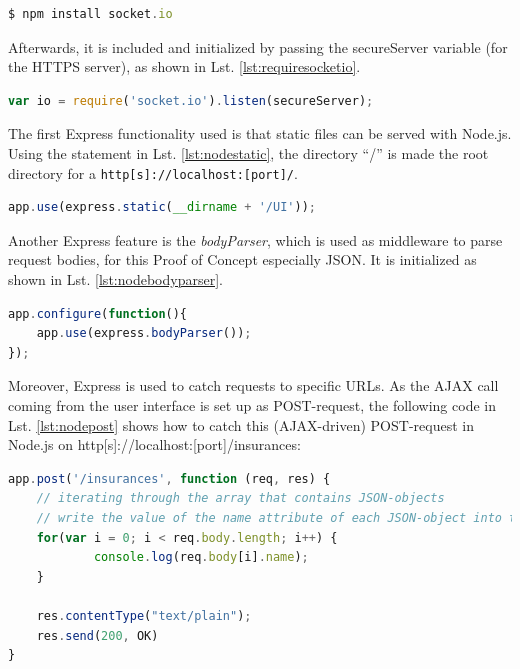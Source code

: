 \begin{lstlisting}[language=javascript,
caption={Command to install socket.io via Node.js' package manager},
label=lst:installsocketio,
morekeywords={npm}]
$ npm install socket.io
\end{lstlisting}%

Afterwards, it is included and initialized by passing the secureServer variable
(for the HTTPS server), as shown in Lst. \ref{lst:requiresocketio}.

\begin{lstlisting}[language=javascript,caption={Initialization of the socket.io module in Node.js},label=lst:requiresocketio]
var io = require('socket.io').listen(secureServer);
\end{lstlisting}

The first Express functionality used is that static files can be served with
Node.js. Using the statement in Lst. \ref{lst:nodestatic}, the directory “/” is made the root
directory for a \texttt{http[s]://localhost:[port]/}.

\begin{lstlisting}[language=javascript,caption={Serving static assets with Express},label=lst:nodestatic]
app.use(express.static(__dirname + '/UI'));
\end{lstlisting}

Another Express feature is the \textit{bodyParser}, which is used as middleware to
parse request bodies, for this Proof of Concept especially JSON. It is initialized as shown in Lst. \ref{lst:nodebodyparser}.

\begin{lstlisting}[language=javascript,caption={Using the bodyParser},label=lst:nodebodyparser]
app.configure(function(){
    app.use(express.bodyParser());
});
\end{lstlisting}

Moreover, Express is used to catch requests to specific URLs. As the AJAX call coming from the user interface is set up as POST-request, the following code in Lst. \ref{lst:nodepost} shows how to catch this (AJAX-driven) POST-request in Node.js on http[s]://localhost:[port]/insurances:

\begin{lstlisting}[language=javascript,caption={Iteration through an array consisting of JSON data},label=lst:nodepost]
app.post('/insurances', function (req, res) {
	// iterating through the array that contains JSON-objects
	// write the value of the name attribute of each JSON-object into the console
	for(var i = 0; i < req.body.length; i++) {
        	console.log(req.body[i].name);
	}

	res.contentType("text/plain");
	res.send(200, OK)
}
\end{lstlisting}


